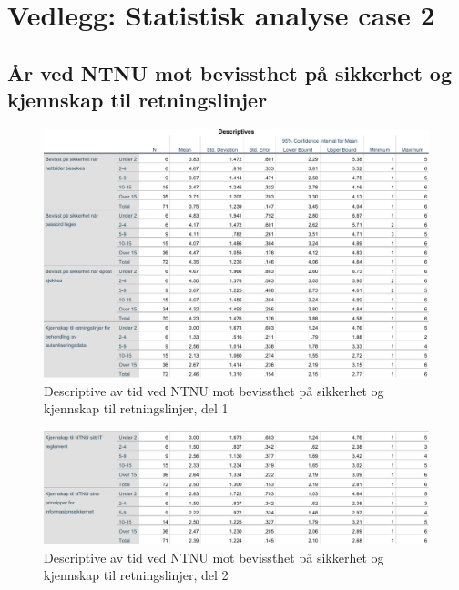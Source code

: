 \chapter{Vedlegg: Statistisk analyse case 2}
\label{vedlegg:statanalys}

\section*{År ved NTNU mot bevissthet på sikkerhet og kjennskap til retningslinjer}
\label{aarvedNTNU-mot-bevissthetogkjennskap}
\begin{figure}[H]
    \centering
    \includegraphics[scale=0.7]{case_2/bilder/spss/anova_ttest/ansiennitet_bevissthetogkjennskap_descriptive_1.pdf}
    \caption[Antall år ved NTNU mot bevissthet og kjennskap descriptive 1]{Descriptive av tid ved NTNU mot bevissthet på sikkerhet og kjennskap til retningslinjer, del 1}
    \label{fig:ansiennitet-bevissthetogkjennskap-descriptive-1}
\end{figure}

\begin{figure}[H]
    \centering
    \includegraphics[scale=0.7]{case_2/bilder/spss/anova_ttest/ansiennitet_bevissthetogkjennskap_descriptive_2.pdf}
    \caption[Antall år ved NTNU mot bevissthet og kjennskap descriptive 2]{Descriptive av tid ved NTNU mot bevissthet på sikkerhet og kjennskap til retningslinjer, del 2}
    \label{fig:ansiennitet-bevissthetogkjennskap-descriptive-2}
\end{figure}

